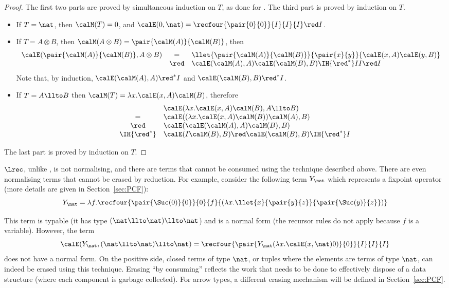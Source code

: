 \documentclass{article}
\begin{document}
\begin{proof}
The first two parts are proved by simultaneous induction on $T$, as done for \LLCI\cite{AlvesS:TCS}.
The third part is proved by induction on $T$.\begin{itemize}
\item If $T = \nat$, then $\calM(T) = 0$, and $\calE(0,\nat) = \recfour{\pair{0}{0}}{I}{I}{I}\red I$.
\item If $T= A \otimes B$, then $\calM( A \otimes B) = \pair{\calM(A)}{\calM(B)}$, then 
\[
\begin{array}{lcl}
\calE(\pair{\calM(A)}{\calM(B)}, A \otimes B) &=& \llet{\pair{\calM(A)}{\calM(B)}}{\pair{x}{y}}{\calE(x,A)\calE(y,B)} \\
&\red & \calE(\calM(A),A) \calE(\calM(B),B)\IH{\red^*} II \red I
\end{array}
\]
Note that, by induction, $\calE(\calM(A),A)\red^* I$ and $\calE(\calM(B),B)\red^*I$.
\item  If  $T= A \llto B$ then $\calM(T) = \lambda x.\calE(x,A)\calM(B)$, therefore\\
\[
\begin{array}{lcl}
&&\calE(\lambda x.\calE(x,A)\calM(B),A\llto B) \\
&=& \calE((\lambda x.\calE(x,A)\calM(B))\calM(A),B)\\
&\red& \calE(\calE(\calM(A),A)\calM(B),B)\\
&\IH{\red^*}&  \calE(I\calM(B),B) \red  \calE(\calM(B),B)\IH{\red^*}  I 
\end{array}
\]
\end{itemize}
The last part is proved by induction on $T$.
\end{proof}

$\Lrec$, unlike \LLCI, is not normalising, and there are terms that
cannot be consumed using the technique described above. There are even
normalising terms that cannot be erased by reduction. For example,
consider the following term $Y_\nat$ which represents a fixpoint
operator (more details are given in Section~\ref{sec:PCF}):
\[
Y_\nat = \lambda f.\recfour{\pair{\Suc(0)}{0}}{0}{f}{(\lambda x. \llet{x}{\pair{y}{z}}{\pair{\Suc(y)}{z}})} 
\]

This term is typable (it has type $(\nat \llto\nat)\llto \nat$) and
is a normal form (the recursor rules do not apply because $f$ is a
variable).  However, the term 
$$\calE(Y_\nat,(\nat \llto\nat)\llto \nat) = 
\recfour{\pair{Y_\nat (\lambda x.\calE(x,\nat)0)}{0}} {I}{I}{I}$$ does
not have a normal form.  On the positive side, closed terms of type
$\nat$, or tuples where the elements are terms of type $\nat$, can
indeed be erased using this technique. Erasing ``by consuming''
reflects the work that needs to be done to effectively dispose of a
data structure (where each component is garbage collected).  For arrow
types, a different erasing mechanism will be defined in
Section~\ref{sec:PCF}.
\end{document}
